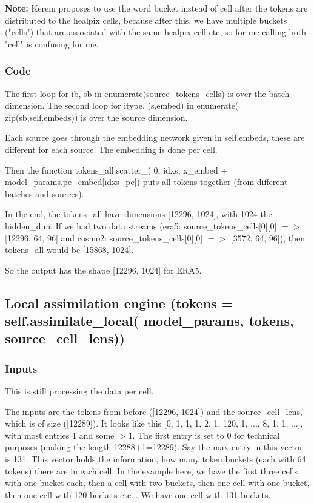 \documentclass{article}
\begin{document}
\textbf{Note:} Kerem proposes to use the word bucket instead of cell after the tokens are distributed to the healpix cells, because after this, we have multiple buckets ("cells") that are associated with the same healpix cell etc, so for me calling both "cell" is confusing for me.

\subsubsection{Code}
The first loop for ib, sb in enumerate(source\_tokens\_cells) is over the batch dimension. The second loop for itype, (s,embed) in enumerate( zip(sb,self.embeds)) is over the source dimension.

Each source goes through the embedding network given in self.embeds, these are different for each source. The embedding is done per cell.

Then the function tokens\_all.scatter\_( 0, idxs, x\_embed + model\_params.pe\_embed[idxs\_pe]) puts all tokens together (from different batches and sources).

In the end, the tokens\_all have dimensions [12296, 1024], with 1024 the hidden\_dim. If we had two data streams (era5: source\_tokens\_cells[0][0] $=>$ [12296, 64, 96] and cosmo2: source\_tokens\_cells[0][0] $=>$ [3572, 64, 96]), then tokens\_all would be [15868, 1024].

So the output has the shape [12296, 1024] for ERA5.

\subsection{Local assimilation engine (tokens = self.assimilate\_local( model\_params, tokens, source\_cell\_lens))}
\subsubsection{Inputs}
This is still processing the data per cell.

The inputs are the tokens from before ([12296, 1024]) and the source\_cell\_lens, which is of size ([12289]). It looks like this [0, 1, 1, 1, 2, 1, 120, 1, ..., 8, 1, 1, ...], with most entries 1 and some $>$1. The first entry is set to 0 for technical purposes (making the length 12288+1=12289). Say the max entry in this vector is 131. This vector holds the information, how many token buckets (each with 64 tokens) there are in each cell. In the example here, we have the first three cells with one bucket each, then a cell with two buckets, then one cell with one bucket, then one cell with 120 buckets etc... We have one cell with 131 buckets.
\end{document}
